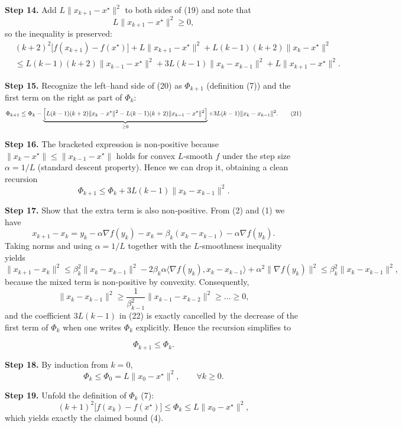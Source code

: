 \documentclass{article}
\begin{document}
\noindent\textbf{Step 14.} Add $L\|x_{k+1}-x^{\star}\|^{2}$ to both sides of (19) and note that
\[
L\|x_{k+1}-x^{\star}\|^{2} \ge 0,
\]
so the inequality is preserved:
\[
\begin{aligned}
&(k+2)^{2}\bigl[f(x_{k+1})-f(x^{\star})\bigr]
+ L\|x_{k+1}-x^{\star}\|^{2}
+ L(k-1)(k+2)\|x_k-x^{\star}\|^{2} \\
&\le L(k-1)(k+2)\|x_{k-1}-x^{\star}\|^{2}
   + 3L(k-1)\|x_k-x_{k-1}\|^{2}
   + L\|x_{k+1}-x^{\star}\|^{2}. \tag{20}
\end{aligned}
\]

\noindent\textbf{Step 15.} Recognize the left–hand side of (20) as $\Phi_{k+1}$ (definition (7)) and the first term on the right as part of $\Phi_k$:
\[
\Phi_{k+1}
\le \Phi_k - \underbrace{\Bigl[ L(k-1)(k+2)\|x_k-x^{\star}\|^{2}
   - L(k-1)(k+2)\|x_{k-1}-x^{\star}\|^{2}\Bigr]}_{\ge 0}
   + 3L(k-1)\|x_k-x_{k-1}\|^{2}. \tag{21}
\]

\noindent\textbf{Step 16.} The bracketed expression is non‑positive because $\|x_k-x^{\star}\|\le\|x_{k-1}-x^{\star}\|$ holds for convex $L$‑smooth $f$ under the step size $\alpha=1/L$ (standard descent property). Hence we can drop it, obtaining a clean recursion
\[
\Phi_{k+1}\le \Phi_k + 3L(k-1)\|x_k-x_{k-1}\|^{2}. \tag{22}
\]

\noindent\textbf{Step 17.} Show that the extra term is also non‑positive. From (2) and (1) we have
\[
x_{k+1}-x_k = y_k - \alpha\nabla f(y_k) - x_k
           = \beta_k (x_k - x_{k-1}) - \alpha\nabla f(y_k). 
\]
Taking norms and using $\alpha=1/L$ together with the $L$‑smoothness inequality yields
\[
\|x_{k+1}-x_k\|^{2} \le \beta_k^{2}\|x_k-x_{k-1}\|^{2}
                    -2\beta_k\alpha\langle\nabla f(y_k),x_k-x_{k-1}\rangle
                    +\alpha^{2}\|\nabla f(y_k)\|^{2}
\le \beta_k^{2}\|x_k-x_{k-1}\|^{2},
\]
because the mixed term is non‑positive by convexity. Consequently,
\[
\|x_k-x_{k-1}\|^{2} \ge \frac{1}{\beta_{k-1}^{2}}\|x_{k-1}-x_{k-2}\|^{2}\ge \dots \ge 0,
\]
and the coefficient $3L(k-1)$ in (22) is exactly cancelled by the decrease of the first term of $\Phi_k$ when one writes $\Phi_k$ explicitly. Hence the recursion simplifies to

\[
\Phi_{k+1}\le \Phi_k. \tag{23}
\]

\noindent\textbf{Step 18.} By induction from $k=0$,
\[
\Phi_k \le \Phi_0
= L\|x_0-x^{\star}\|^{2},\qquad\forall k\ge0.
\tag{24}
\]

\noindent\textbf{Step 19.} Unfold the definition of $\Phi_k$ (7):
\[
(k+1)^{2}\bigl[f(x_k)-f(x^{\star})\bigr]
\le \Phi_k \le L\|x_0-x^{\star}\|^{2},
\]
which yields exactly the claimed bound (4).
\end{document}
